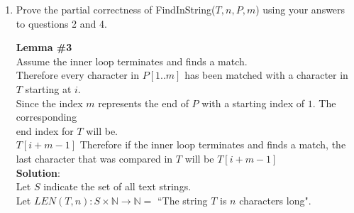 \documentclass[11pt]{article}
\def\nats {{\mathbb N}}
\def\ints {{\mathbb Z}}
\begin{document}
\begin{enumerate}
\begin{solution}
{\bf Solution}:\\
{\bf Lemma \#2}\\
Let $l\in\ints^+$ be arbitrary\\
\null\quad Assume that the $l$th iteration occurs\\
\null\quad Therefore the inner loop must terminate\\
\null\quad By lemma \#1, if the inner loop terminates, either a match was found at $T[l]$ or \\
\null\quad no match was found.\\
\null\quad If a match was found, $j_l> m$ must be true since the last value $P[m]$ was checked and then\\
\null\quad $j=m$ was incremented to $j=m+1$.\\
\null\quad Therefore the condition on line $9$ will pass and the loop will return before reaching line $10$\\
\null\quad Therefore, if line $10$ is reached the condition $T[i_l..k_l] = P[1..j_l]$ must have failed.\\
\null\quad Therefore $T[i_l..k_l] \ne P[1..j_l] $\\
Therefore $\forall l\in\ints^+.T[i_1..k_1] \ne P[1..j_1]$\\
\end{solution}

\item
\begin{question}
Prove the partial correctness of FindInString($T,n,P,m$) using your answers to questions 2 and 4.
\end{question}

\begin{solution}
{\bf Lemma \#3}\\
\null\quad Assume the inner loop terminates and finds a match.\\
\null\quad Therefore every character in $P[1..m]$ has been matched with a character in $T$ starting at $i$.\\
\null\quad Since the index $m$ represents the end of $P$ with a starting index of $1$. The corresponding \\
\null\quad end index for $T$ will be.\\
\null\quad $T[i+m-1]$
Therefore if the inner loop terminates and finds a match, the last character that was compared in $T$ will be $T[i+m-1]$\\

{\bf Solution}:\\
Let $S$ indicate the set of all text strings.\\
Let $LEN(T, n): S\times \nats \rightarrow \nats = $ ``The string $T$ is $n$ characters long".\\


\end{solution}
\end{enumerate}
\end{document}
